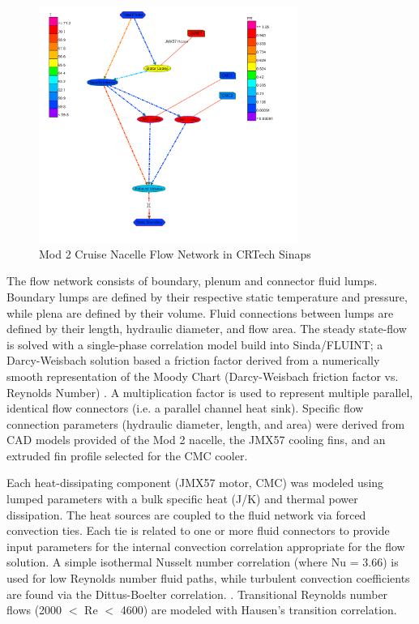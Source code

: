 \documentclass[]{aiaa-tc}%
\begin{document}
\begin{figure}[!htb]%
	\centering
	\includegraphics[width=0.75\textwidth]{figures/sinaps_paramsweep.PNG}
	\caption{Mod 2 Cruise Nacelle Flow Network in CRTech Sinaps}
	\label{fig:Sinaps}
\end{figure}

The flow network consists of boundary, plenum and connector fluid lumps.  Boundary lumps are defined by their respective static temperature and pressure, while plena are defined by their volume.  Fluid connections between lumps are defined by their length, hydraulic diameter, and flow area.  The steady state-flow is solved with a single-phase correlation model build into Sinda/FLUINT; a Darcy-Weisbach solution based a friction factor derived from a numerically smooth representation of the Moody Chart  (Darcy-Weisbach friction factor vs. Reynolds Number) \cite{CRtech_2013}.  A multiplication factor is used to represent multiple parallel, identical flow connectors (i.e. a parallel channel heat sink).  Specific flow connection parameters (hydraulic diameter, length, and area) were derived from CAD models provided of the Mod 2 nacelle, the JMX57 cooling fins, and an extruded fin profile selected for the CMC cooler.  

Each heat-dissipating component (JMX57 motor, CMC) was modeled using lumped parameters with a bulk specific heat (J/K) and thermal power dissipation.  The heat sources are coupled to the fluid network via forced convection ties.  Each tie is related to one or more fluid connectors to provide input parameters for the internal convection correlation appropriate for the flow solution.  A simple isothermal Nusselt number correlation (where Nu = 3.66) is used for low Reynolds number fluid paths, while turbulent convection coefficients are found via the Dittus-Boelter correlation. \cite{CRtech_2015}.  Transitional Reynolds number flows (2000 $<$ Re $<$ 4600) are modeled with Hausen’s transition correlation. \cite{Kays}
\end{document}
